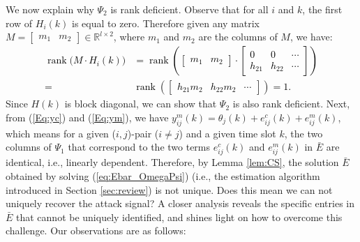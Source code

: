 We now explain why $\Psi_2$ is rank deficient.
Observe that for all $i$ and $k$, the first row of $H_i(k)$ is equal to zero. Therefore given any matrix $M = \begin{bmatrix} m_1 & m_2 \end{bmatrix} \in \mathbb{R}^{l \times 2}$, where $m_1$ and $m_2$ are the columns of $M$, we have:
\textcolor{black}{\begin{align}
\operatorname{rank} \big( M \cdot H_i(k) \big) &=  \operatorname{rank} \left( \begin{bmatrix} m_1 & m_2  \end{bmatrix} \cdot \begin{bmatrix} 0 & 0 & \cdots \\ h_{21} & h_{22} & \cdots \end{bmatrix} \right)\nonumber\\
	= &\operatorname{rank} \left( \begin{bmatrix} h_{21} m_2 & h_{22} m_2 & \cdots \end{bmatrix} \right)=1.
\end{align}}
Since $H(k)$ is block diagonal, we can show that $\Psi_2$ is also rank deficient.
Next, from (\ref{Eq:yc}) and (\ref{Eq:ym}), we have $y^m_{ij}(k) = \theta_j(k) + e^c_{ij}(k) + e^m_{ij}(k)$, which means for a given ($i,j$)-pair ($i \neq j$) and a given time slot $k$, the two columns of $\Psi_1$ that correspond to the two terms $e^c_{ij}(k)$ and $e^m_{ij}(k)$ in $\bar E$ are identical, i.e., linearly dependent. Therefore, by Lemma \ref{lem:CS}, the solution $\bar E$ obtained by solving (\ref{eq:Ebar_OmegaPsi}) (i.e., the estimation algorithm introduced in Section \ref{sec:review}) is not unique.
Does this mean we can not uniquely recover the attack signal?
A closer analysis reveals the specific entries in $\bar E$ that cannot be uniquely identified, and shines light on how to overcome this challenge. Our observations are as follows:
